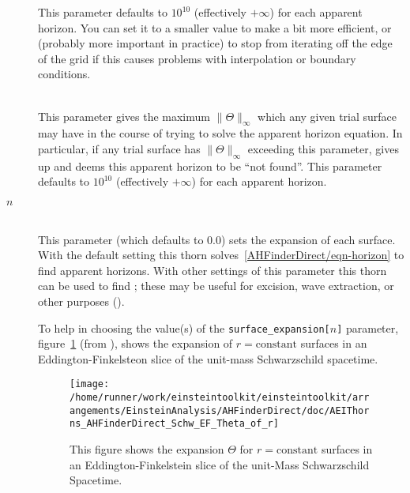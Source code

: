 \begin{description}
	This parameter defaults to $10^{10}$ (effectively $+\infty$)
	for each apparent horizon.  You can set it to a smaller value
	to make  a bit more efficient, or
	(probably more important in practice) to stop
	 from iterating off the edge of the grid
	if this causes problems with interpolation or boundary conditions.

\item[\code{max\_allowable\_Theta}]
\mbox{}\\
	This parameter gives the maximum $\|\Theta\|_\infty$
	which any given trial surface may have in the course of
	trying to solve the apparent horizon equation.
	In particular, if any trial surface has $\|\Theta\|_\infty$
	exceeding this parameter,  gives up
	and deems this apparent horizon to be ``not found''.
	This parameter defaults to $10^{10}$ (effectively $+\infty$)
	for each apparent horizon.

\item[\code{surface\_expansion[}$n$\code{]}]
\mbox{}\\
	This parameter (which defaults to 0.0) sets the expansion
	of each surface.  With the default setting this thorn
	solves~\eqref{AHFinderDirect/eqn-horizon} to find apparent
	horizons.  With other settings of this parameter this thorn
	can be used to find ;
	these may be useful for excision, wave extraction, or
	other purposes (\cite{AHFinderDirect/Schnetter03a}).

	To help in choosing the value(s) of the
	\verb|surface_expansion[|$n$\verb|]| parameter,
	figure~\ref{AHFinderDirect/fig-Schwarzschild-EF-Theta(r)}
	(from \cite{AHFinderDirect/Thornburg95}),
	shows the expansion of $r = \text{constant}$ surfaces
	in an Eddington-Finkelsteon slice of the unit-mass
	Schwarzschild spacetime.

\begin{figure}[htbp]
\begin{center}
\texttt{[image: /home/runner/work/einsteintoolkit/einsteintoolkit/arrangements/EinsteinAnalysis/AHFinderDirect/doc/AEIThorns\_AHFinderDirect\_Schw\_EF\_Theta\_of\_r]}
\end{center}
\caption[Expansion $\Theta$ for $r = \text{constant}$ Surfaces
	 in an Eddington-Finkelstein slice
	 of the Unit-Mass Schwarzschild Spacetime]
	{
	This figure shows the expansion $\Theta$ for $r = \text{constant}$
	surfaces in an Eddington-Finkelstein slice of the unit-Mass
	Schwarzschild Spacetime.
	}
\label{AHFinderDirect/fig-Schwarzschild-EF-Theta(r)}
\end{figure}

\end{description}

